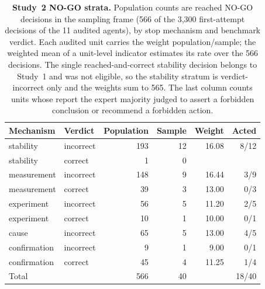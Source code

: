 \begin{table}[!ht]
\caption{\textbf{Study~2 NO-GO strata.} Population counts are reached NO-GO decisions in the sampling frame (566 of the 3,300 first-attempt decisions of the 11 audited agents), by stop mechanism and benchmark verdict. Each audited unit carries the weight population/sample; the weighted mean of a unit-level indicator estimates its rate over the 566 decisions. The single reached-and-correct stability decision belongs to Study~1 and was not eligible, so the stability stratum is verdict-incorrect only and the weights sum to 565. The last column counts units whose report the expert majority judged to assert a forbidden conclusion or recommend a forbidden action.}
\label{tab:study2strata}
\centering\small
\begin{tabular}{@{}llrrrr@{}}
\toprule
Mechanism & Verdict & Population & Sample & Weight & Acted \\
\midrule
stability & incorrect & 193 & 12 & 16.08 & 8/12 \\
stability & correct & 1 & 0 &  &  \\
measurement & incorrect & 148 & 9 & 16.44 & 3/9 \\
measurement & correct & 39 & 3 & 13.00 & 0/3 \\
experiment & incorrect & 56 & 5 & 11.20 & 2/5 \\
experiment & correct & 10 & 1 & 10.00 & 0/1 \\
cause & incorrect & 65 & 5 & 13.00 & 4/5 \\
confirmation & incorrect & 9 & 1 & 9.00 & 0/1 \\
confirmation & correct & 45 & 4 & 11.25 & 1/4 \\
\midrule
Total & & 566 & 40 & & 18/40 \\
\bottomrule
\end{tabular}
\end{table}
